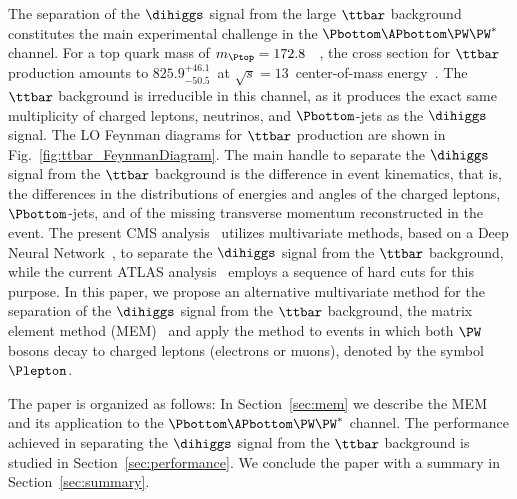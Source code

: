 The separation of the $\dihiggs$ signal from the large $\ttbar$ background constitutes the main experimental challenge in the $\Pbottom\APbottom\PW\PW^{\ast}$ channel.
For a top quark mass of $m_{\Ptop} = 172.8$~\GeV~\cite{PDG},
the cross section for $\ttbar$ production amounts to $825.9^{+46.1}_{-50.5}$~\pb at $\sqrt{s} = 13$~\TeV center-of-mass energy~\cite{Czakon:2011xx}.
The $\ttbar$ background is irreducible in this channel, as it produces the exact same multiplicity of charged leptons, neutrinos, and $\Pbottom$-jets as the $\dihiggs$ signal.
The LO Feynman diagrams for $\ttbar$ production are shown in Fig.~\ref{fig:ttbar_FeynmanDiagram}.
The main handle to separate the $\dihiggs$ signal from the $\ttbar$ background is the difference in event kinematics,
that is, the differences in the distributions of energies and angles of the charged leptons, $\Pbottom$-jets, and of the missing transverse momentum reconstructed in the event.
The present CMS analysis~\cite{HIG-17-006} utilizes multivariate methods, based on a Deep Neural Network~\cite{ANN,chollet2015keras},
to separate the $\dihiggs$ signal from the $\ttbar$ background, while the current ATLAS analysis~\cite{Aaboud:2018zhh} employs a sequence of hard cuts for this purpose.
In this paper, we propose an alternative multivariate method for the separation of the $\dihiggs$ signal from the $\ttbar$ background,
the matrix element method (MEM)~\cite{Kondo:1988yd,Kondo:1991dw} and apply the method to events in which both $\PW$ bosons decay to charged leptons (electrons or muons),
denoted by the symbol $\Plepton$.

The paper is organized as follows:
In Section~\ref{sec:mem} we describe the MEM and its application to the $\Pbottom\APbottom\PW\PW^{\ast}$ channel.
The performance achieved in separating the $\dihiggs$ signal 
from the $\ttbar$ background is studied in Section~\ref{sec:performance}.
We conclude the paper with a summary in Section~\ref{sec:summary}.
